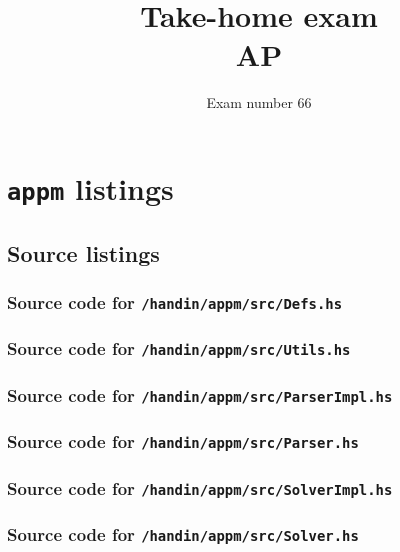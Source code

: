 \documentclass[12pt,a4paper]{article}
\begin{document}
\title{%
  Take-home exam \\
  AP
}%
\author{Exam number 66}

\maketitle
\thispagestyle{empty}
\newpage
\setcounter{page}{1}





\newpage
\appendix

\section{\texttt{appm} listings}
\subsection{Source listings}
\subsubsection{Source code for \texttt{/handin/appm/src/Defs.hs}}

\subsubsection{Source code for \texttt{/handin/appm/src/Utils.hs}}

\subsubsection{Source code for \texttt{/handin/appm/src/ParserImpl.hs}}

\subsubsection{Source code for \texttt{/handin/appm/src/Parser.hs}}

\subsubsection{Source code for \texttt{/handin/appm/src/SolverImpl.hs}}

\subsubsection{Source code for \texttt{/handin/appm/src/Solver.hs}}

\end{document}
